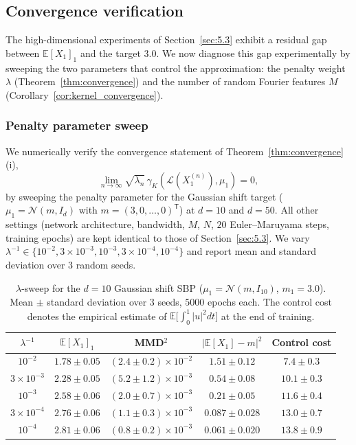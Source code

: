 \documentclass[11pt,leqno]{article}
\theoremstyle{plain}
\theoremstyle{remark}
\theoremstyle{definition}
\numberwithin{equation}{section}
\numberwithin{figure}{section}
\numberwithin{table}{section}
\numberwithin{algorithm}{section}
\newcommand{\EE}{\mathbb{E}}
\begin{document}
\subsection{Convergence verification}\label{sec:conv_ver}

The high-dimensional experiments of Section~\ref{sec:5.3} exhibit a residual gap
between $\EE[X_1]_1$ and the target $3.0$.
We now diagnose this gap experimentally by sweeping the two parameters
that control the approximation: the penalty weight $\lambda$ (Theorem~\ref{thm:convergence})
and the number of random Fourier features $M$ (Corollary~\ref{cor:kernel_convergence}).

\subsubsection{Penalty parameter sweep}\label{sec:5.4lam}

We numerically verify the convergence statement of Theorem~\ref{thm:convergence} (i),
\[
 \lim_{n\to\infty}\sqrt{\lambda_n}\,\gamma_K(\mathcal{L}(X_1^{(n)}),\mu_1) = 0,
\]
by sweeping the penalty parameter for the Gaussian shift target
($\mu_1=\mathcal{N}(m,I_d)$ with $m=(3,0,\ldots,0)^{\mathsf{T}}$) at $d=10$ and $d=50$.
All other settings (network architecture, bandwidth, $M$, $N$, $20$ Euler--Maruyama steps, training epochs)
are kept identical to those of Section~\ref{sec:5.3}.
We vary $\lambda^{-1}\in\{10^{-2}, 3\times 10^{-3}, 10^{-3}, 3\times 10^{-4}, 10^{-4}\}$
and report mean and standard deviation over $3$ random seeds.

\begin{table}[htbp]
\centering
\caption{$\lambda$-sweep for the $d=10$ Gaussian shift SBP
($\mu_1=\mathcal{N}(m, I_{10})$, $m_1=3.0$).
Mean $\pm$ standard deviation over $3$ seeds, $5000$ epochs each.
The control cost denotes the empirical estimate of $\EE\bigl[\int_0^1|u|^2 dt\bigr]$ at the end of training.}
\label{tab:lambda_sweep}
\begin{tabular}{ccccc}
\toprule
$\lambda^{-1}$ & $\EE[X_1]_1$ & MMD${}^2$ & $|\EE[X_1]-m|^2$ & Control cost \\
\midrule
$10^{-2}$            & $1.78\pm 0.05$ & $(2.4\pm 0.2)\times 10^{-2}$ & $1.51\pm 0.12$ & $7.4\pm 0.3$ \\
$3\times 10^{-3}$    & $2.28\pm 0.05$ & $(5.2\pm 1.2)\times 10^{-3}$ & $0.54\pm 0.08$ & $10.1\pm 0.3$ \\
$10^{-3}$            & $2.58\pm 0.06$ & $(2.0\pm 0.7)\times 10^{-3}$ & $0.21\pm 0.05$ & $11.6\pm 0.4$ \\
$3\times 10^{-4}$    & $2.76\pm 0.06$ & $(1.1\pm 0.3)\times 10^{-3}$ & $0.087\pm 0.028$ & $13.0\pm 0.7$ \\
$10^{-4}$            & $2.81\pm 0.06$ & $(0.8\pm 0.2)\times 10^{-3}$ & $0.061\pm 0.020$ & $13.8\pm 0.9$ \\
\bottomrule
\end{tabular}
\end{table}
\end{document}
